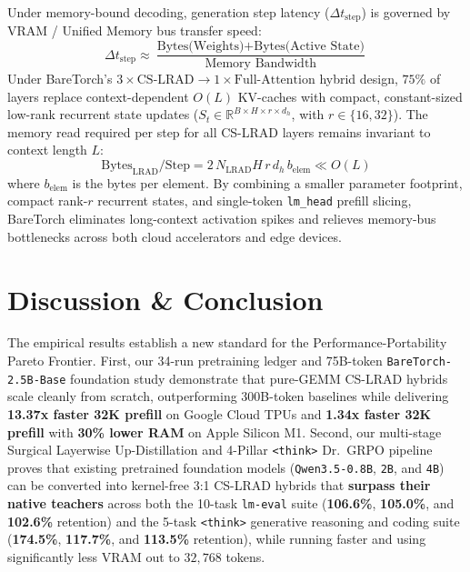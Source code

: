 \documentclass[twocolumn,10pt]{article}
\begin{document}
Under memory-bound decoding, generation step latency ($\Delta t_{\text{step}}$) is governed by VRAM / Unified Memory bus transfer speed:
\begin{equation*}
\Delta t_{\text{step}} \approx \frac{\text{Bytes(Weights)} + \text{Bytes(Active State)}}{\text{Memory Bandwidth}}
\end{equation*}
Under BareTorch's $3 \times \text{CS-LRAD} \to 1 \times \text{Full-Attention}$ hybrid design, $75\%$ of layers replace context-dependent $O(L)$ KV-caches with compact, constant-sized low-rank recurrent state updates ($S_t \in \mathbb{R}^{B \times H \times r \times d_h}$, with $r \in \{16, 32\}$). The memory read required per step for all CS-LRAD layers remains invariant to context length $L$:
\begin{equation*}
\text{Bytes}_{\text{LRAD}} / \text{Step} = 2 \, N_{\text{LRAD}} H \, r \, d_h \, b_{\text{elem}} \ll O(L)
\end{equation*}
where $b_{\text{elem}}$ is the bytes per element. By combining a smaller parameter footprint, compact rank-$r$ recurrent states, and single-token \texttt{lm\_head} prefill slicing, BareTorch eliminates long-context activation spikes and relieves memory-bus bottlenecks across both cloud accelerators and edge devices.

\section{Discussion \& Conclusion}
The empirical results establish a new standard for the Performance-Portability Pareto Frontier. First, our 34-run pretraining ledger and 75B-token \texttt{BareTorch-2.5B-Base} foundation study demonstrate that pure-GEMM CS-LRAD hybrids scale cleanly from scratch, outperforming 300B-token baselines while delivering \textbf{13.37x faster 32K prefill} on Google Cloud TPUs and \textbf{1.34x faster 32K prefill} with \textbf{30\% lower RAM} on Apple Silicon M1. Second, our multi-stage Surgical Layerwise Up-Distillation and 4-Pillar \texttt{<think>} Dr.\ GRPO pipeline proves that existing pretrained foundation models (\texttt{Qwen3.5-0.8B}, \texttt{2B}, and \texttt{4B}) can be converted into kernel-free 3:1 CS-LRAD hybrids that \textbf{surpass their native teachers} across both the 10-task \texttt{lm-eval} suite (\textbf{106.6\%}, \textbf{105.0\%}, and \textbf{102.6\%} retention) and the 5-task \texttt{<think>} generative reasoning and coding suite (\textbf{174.5\%}, \textbf{117.7\%}, and \textbf{113.5\%} retention), while running faster and using significantly less VRAM out to $32,768$ tokens.
\end{document}
